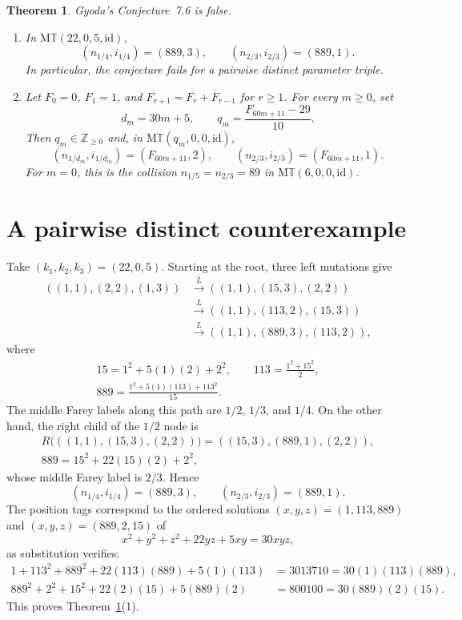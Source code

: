 \documentclass[11pt]{amsart}
\newtheorem{theorem}{Theorem}
\newcommand{\GMT}{\mathrm{M}\mathbb{T}}
\newcommand{\id}{\mathrm{id}}
\begin{document}
\begin{theorem}\label{thm:main}
Gyoda's Conjecture~7.6 is false.
\begin{enumerate}
\item
In $\GMT(22,0,5,\id)$,
\[
 (n_{1/4},i_{1/4})=(889,3),
 \qquad
 (n_{2/3},i_{2/3})=(889,1).
\]
In particular, the conjecture fails for a pairwise distinct parameter triple.

\item
Let $F_0=0$, $F_1=1$, and
$F_{r+1}=F_r+F_{r-1}$ for $r\ge1$. For every $m\ge0$, set
\[
 d_m=30m+5,
 \qquad
 q_m=\frac{F_{60m+11}-29}{10}.
\]
Then $q_m\in\mathbb Z_{\ge0}$ and, in $\GMT(q_m,0,0,\id)$,
\[
 (n_{1/d_m},i_{1/d_m})=(F_{60m+11},2),
 \qquad
 (n_{2/3},i_{2/3})=(F_{60m+11},1).
\]
For $m=0$, this is the collision
$n_{1/5}=n_{2/3}=89$ in $\GMT(6,0,0,\id)$.
\end{enumerate}
\end{theorem}

\section{A pairwise distinct counterexample}

Take $(k_1,k_2,k_3)=(22,0,5)$. Starting at the root, three left mutations
give
\begin{align*}
 ((1,1),(2,2),(1,3))
 &\xrightarrow{L}((1,1),(15,3),(2,2))\\
 &\xrightarrow{L}((1,1),(113,2),(15,3))\\
 &\xrightarrow{L}((1,1),(889,3),(113,2)),
\end{align*}
where
\begin{gather*}
 15=1^2+5(1)(2)+2^2,
 \qquad
 113=\frac{1^2+15^2}{2},\\
 889=\frac{1^2+5(1)(113)+113^2}{15}.
\end{gather*}
The middle Farey labels along this path are $1/2$, $1/3$, and $1/4$.
On the other hand, the right child of the $1/2$ node is
\begin{gather*}
 R\bigl(((1,1),(15,3),(2,2))\bigr)
 =((15,3),(889,1),(2,2)),\\
 889=15^2+22(15)(2)+2^2,
\end{gather*}
whose middle Farey label is $2/3$. Hence
\[
 (n_{1/4},i_{1/4})=(889,3),
 \qquad
 (n_{2/3},i_{2/3})=(889,1).
\]
The position tags correspond to the ordered solutions
$(x,y,z)=(1,113,889)$ and $(x,y,z)=(889,2,15)$ of
\[
 x^2+y^2+z^2+22yz+5xy=30xyz,
\]
as substitution verifies:
\begin{align*}
 1+113^2+889^2+22(113)(889)+5(1)(113)
 &=3013710=30(1)(113)(889),\\
 889^2+2^2+15^2+22(2)(15)+5(889)(2)
 &=800100=30(889)(2)(15).
\end{align*}
This proves Theorem~\ref{thm:main}(1).
\end{document}
